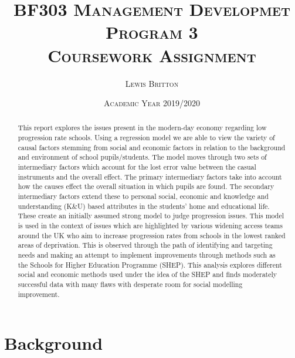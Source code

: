 \documentclass[11pt, english]{article}
\begin{document}

        \title{\textsc{BF303 Management Developmet Program 3\\ Coursework Assignment}}
        \author{\textsc{Lewis Britton}}
        \date{\textsc{Academic Year 2019/2020}}
        \maketitle
        
        \begin{abstract}
		This report explores the issues present in the modern-day economy regarding low progression rate schools. Using a regression model we are able to view the variety of causal factors stemming from social and economic factors in relation to the background and environment of school pupils/students. The model moves through two sets of intermediary factors which account for the lost error value between the casual instruments and the overall effect. The primary intermediary factors take into account how the causes effect the overall situation in which pupils are found. The secondary intermediary factors extend these to personal social, economic and knowledge and understanding (K\&U) based attributes in the students’ home and educational life. These create an initially assumed strong model to judge progression issues. This model is used in the context of issues which are highlighted by various widening access teams around the UK who aim to increase progression rates from schools in the lowest ranked areas of deprivation. This is observed through the path of identifying and targeting needs and making an attempt to implement improvements through methods such as the Schools for Higher Education Programme (SHEP). This analysis explores different social and economic methods used under the idea of the SHEP and finds moderately successful data with many flaws with desperate room for social modelling improvement.
	\end{abstract}

\newpage


	\renewcommand{\contentsname}{Table of Contents}

        \tableofcontents

\newpage


\section{Background}
\end{document}
